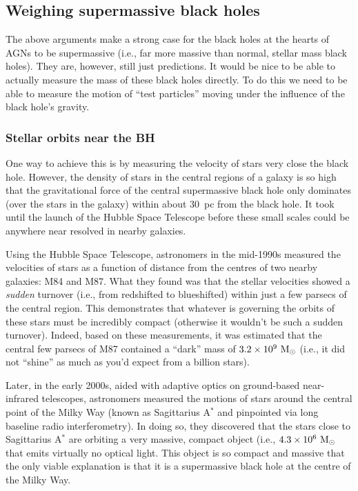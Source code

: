 \documentclass[11pt]{article}
\begin{document}
\subsection{Weighing supermassive black holes}
The above arguments make a strong case for the black holes at the
hearts of AGNs to be supermassive (i.e., far more massive than normal,
stellar mass black holes). They are, however, still just
predictions. It would be nice to be able to actually measure the mass
of these black holes directly. To do this we need to be able to
measure the motion of ``test particles'' moving under the influence
of the black hole's gravity.

\subsubsection{Stellar orbits near the BH}
One way to achieve this is by measuring the velocity of stars
very close the black hole. However, the density of stars in the
central regions of a galaxy is so high that the gravitational force of
the central supermassive black hole only dominates (over the stars in
the galaxy) within about 30~pc from the black hole. It took until the
launch of the Hubble Space Telescope before these small scales could
be anywhere near resolved in nearby galaxies.

Using the Hubble Space Telescope, astronomers in the mid-1990s
measured the velocities of stars as a function of distance from the
centres of two nearby galaxies: M84 and M87. What they found was that
the stellar velocities showed a {\it sudden} turnover (i.e., from
redshifted to blueshifted) within just a few parsecs of the central
region. This demonstrates that whatever is governing the orbits of
these stars must be incredibly compact (otherwise it wouldn't be such
a sudden turnover). Indeed, based on these measurements, it was
estimated that the central few parsecs of M87 contained a ``dark''
mass of ${\rm 3.2\times10^9~M_\odot}$ (i.e., it did not ``shine'' as
much as you'd expect from a billion stars).

Later, in the early 2000s, aided with adaptive optics on ground-based
near-infrared telescopes, astronomers measured the motions of stars
around the central point of the Milky Way (known as Sagittarius
A$^\ast$ and pinpointed via long baseline radio interferometry). In
doing so, they discovered that the stars close to Sagittarius A$^\ast$
are orbiting a very massive, compact object (i.e.,
$4.3\times10^6~{\rm M_\odot}$ that emits virtually no optical
light. This object is so compact and massive that the only viable
explanation is that it is a supermassive black hole at the centre of
the Milky Way.
\end{document}

